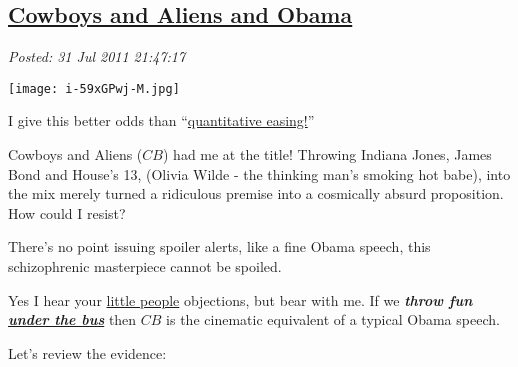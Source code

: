 %

\subsection*{\href{http://bakerjd99.wordpress.com/2011/07/31/cowboys-and-aliens-and-obama/}{Cowboys and Aliens and Obama}}


\noindent\emph{Posted: 31 Jul 2011 21:47:17}
\vspace{6pt}


\captionsetup[floatingfigure]{labelformat=empty}
\begin{floatingfigure}[l]{0.30\textwidth}
\centering
\texttt{[image: i-59xGPwj-M.jpg]}
\caption{I give  this better odds than ``\href{http://www.youtube.com/watch?v=PTUY16CkS-k}{quantitative  easing!}''}
\label{fig:1698X0}
\end{floatingfigure}Cowboys and Aliens ($CB$) had me at the title! Throwing Indiana Jones, James
Bond and House's 13, (Olivia Wilde - the thinking man's smoking hot
babe), into the mix merely turned a ridiculous premise into a cosmically
absurd proposition. How could I resist?

There's no point issuing spoiler alerts, like a fine Obama speech, this
schizophrenic masterpiece cannot be spoiled.

Yes I hear your
\href{http://www.nationalreview.com/corner/267605/safe-sex-and-taxes-are-little-people-victor-davis-hanson}{little
people} objections, but bear with me. If we \emph{\textbf{throw fun
\href{http://www.post-gazette.com/pg/08184/894024-51.stm}{under the
bus}}} then $CB$ is the cinematic equivalent of a typical Obama speech.



Let's review the evidence:


